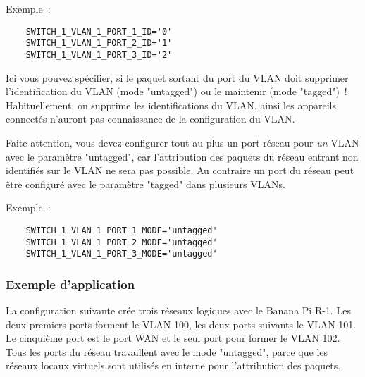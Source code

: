 \begin{description}
Exemple~:

\begin{example}
\begin{verbatim}
    SWITCH_1_VLAN_1_PORT_1_ID='0'
    SWITCH_1_VLAN_1_PORT_2_ID='1'
    SWITCH_1_VLAN_1_PORT_3_ID='2'
\end{verbatim}
\end{example}


Ici vous pouvez spécifier, si le paquet sortant du port du VLAN doit supprimer
l'identification du VLAN (mode "untagged") ou le maintenir (mode "tagged")~!
Habituellement, on supprime les identifications du VLAN, ainsi les appareils
connectés n'auront pas connaissance de la configuration du VLAN.

Faite attention, vous devez configurer tout au plus un port réseau pour \emph{un}
VLAN avec le paramètre "untagged", car l'attribution des paquets du réseau
entrant non identifiés sur le VLAN ne sera pas possible. Au contraire un port
du réseau peut être configuré avec le paramètre "tagged" dans plusieurs VLANs.

Exemple~:

\begin{example}
\begin{verbatim}
    SWITCH_1_VLAN_1_PORT_1_MODE='untagged'
    SWITCH_1_VLAN_1_PORT_2_MODE='untagged'
    SWITCH_1_VLAN_1_PORT_3_MODE='untagged'
\end{verbatim}
\end{example}

\end{description}

\subsubsection{Exemple d'application}

La configuration suivante crée trois réseaux logiques avec le Banana Pi R-1.
Les deux premiers ports forment le VLAN 100, les deux ports suivants le VLAN 101.
Le cinquième port est le port WAN et le seul port pour former le VLAN 102. Tous
les ports du réseau travaillent avec le mode "untagged", parce que les réseaux locaux
virtuels sont utilisés en interne pour l'attribution des paquets.

